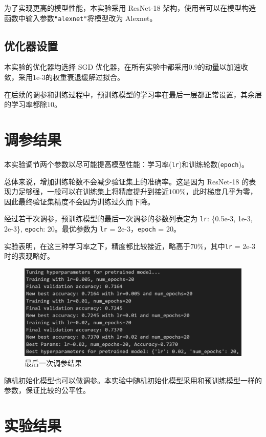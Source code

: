 \documentclass[notitlepage,cs4size,punct,oneside]{ctexrep}
\numberwithin{equation}{chapter}
\theoremstyle{mystyle}
\begin{document}
为了实现更高的模型性能，本实验采用 ResNet-18 架构，使用者可以在模型构造函数中输入参数\texttt{"alexnet"}将模型改为 Alexnet。

\subsection{优化器设置}
本实验的优化器均选择 SGD 优化器，在所有实验中都采用0.9的动量以加速收敛，采用1e-3的权重衰退缓解过拟合。

在后续的调参和训练过程中，预训练模型的学习率在最后一层都正常设置，其余层的学习率都除$10$。


\section{调参结果}
本实验调节两个参数以尽可能提高模型性能：学习率(\texttt{lr})和训练轮数(\texttt{epoch})。

总体来说，增加训练轮数不会减少验证集上的准确率。这是因为 ResNet-18 的表现力足够强，一般可以在训练集上将精度提升到接近$100\%$，此时梯度几乎为零，因此最终验证集精度不会因为训练过久而下降。

经过若干次调参，预训练模型的最后一次调参的参数列表定为 \texttt{lr}: \{0.5e-3, 1e-3, 2e-3\}, \texttt{epoch}: 20。最优参数为 \texttt{lr} = 2e-3，\texttt{epoch} = 20。

实验表明，在这三种学习率之下，精度都比较接近，略高于$70\%$，其中\texttt{lr} = 2e-3时的表现略好。

\begin{figure}[H]
    \centering
    \includegraphics[scale=0.7]{fine.png}
    \caption{最后一次调参结果}
    \label{fig:fine}
\end{figure}

随机初始化模型也可以做调参。本实验中随机初始化模型采用和预训练模型一样的参数，保证比较的公平性。



\section{实验结果}
\end{document}
